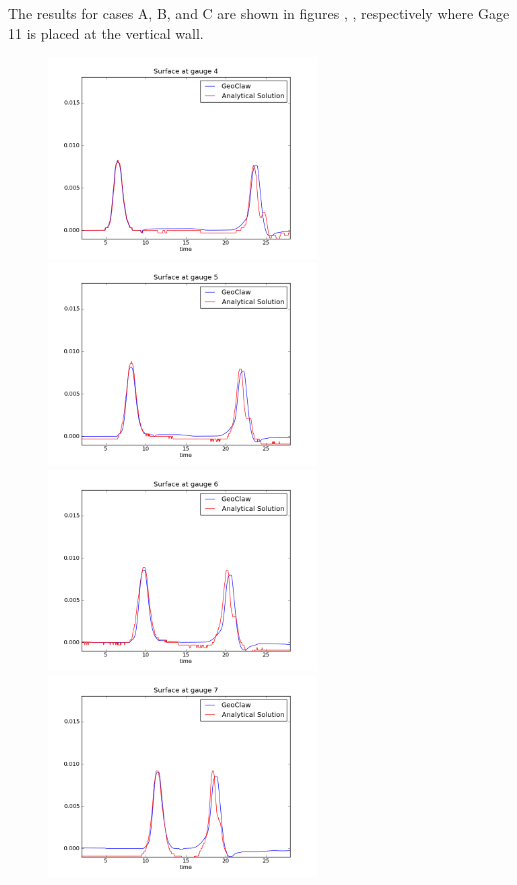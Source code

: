 The results for cases A, B, and C are shown in figures , ,  respectively where Gage 11 is placed at the vertical wall.

\begin{figure}[ht]
\hfil\includegraphics[width=2.8in]{bp2/CaseA/gauge0004fig300.png}\hfil
\hfil\includegraphics[width=2.8in]{bp2/CaseA/gauge0005fig300.png}\hfil
\vskip 5pt
\hfil\includegraphics[width=2.8in]{bp2/CaseA/gauge0006fig300.png}\hfil
\hfil\includegraphics[width=2.8in]{bp2/CaseA/gauge0007fig300.png}\hfil

\end{figure}

